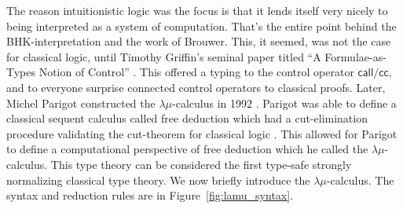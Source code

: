 The reason intuitionistic logic was the focus is that it lends itself
very nicely to being interpreted as a system of computation.  That's
the entire point behind the BHK-interpretation and the work of
Brouwer.  This, it seemed, was not the case for classical logic, until
Timothy Griffin's seminal paper titled ``A Formulae-as-Types Notion of
Control'' \cite{Griffin:1990}.  This offered a typing to the control
operator $\mathsf{call/cc}$, and to everyone surprise
connected control operators to classical
proofs. Later, Michel Parigot constructed the $\lambda\mu$-calculus in
1992 \cite{Parigot:1992}.  Parigot was able to define a classical
sequent calculus called free deduction which had a cut-elimination
procedure validating the cut-theorem for classical logic
\cite{Parigot:1992b}.  This allowed for Parigot to define a
computational perspective of free deduction which he called the
$\lambda\mu$-calculus.  This type theory can be considered the first
type-safe strongly normalizing classical type theory. We now briefly
introduce the $\lambda\mu$-calculus.  The syntax and reduction rules
are in Figure~\ref{fig:lamu_syntax}.

